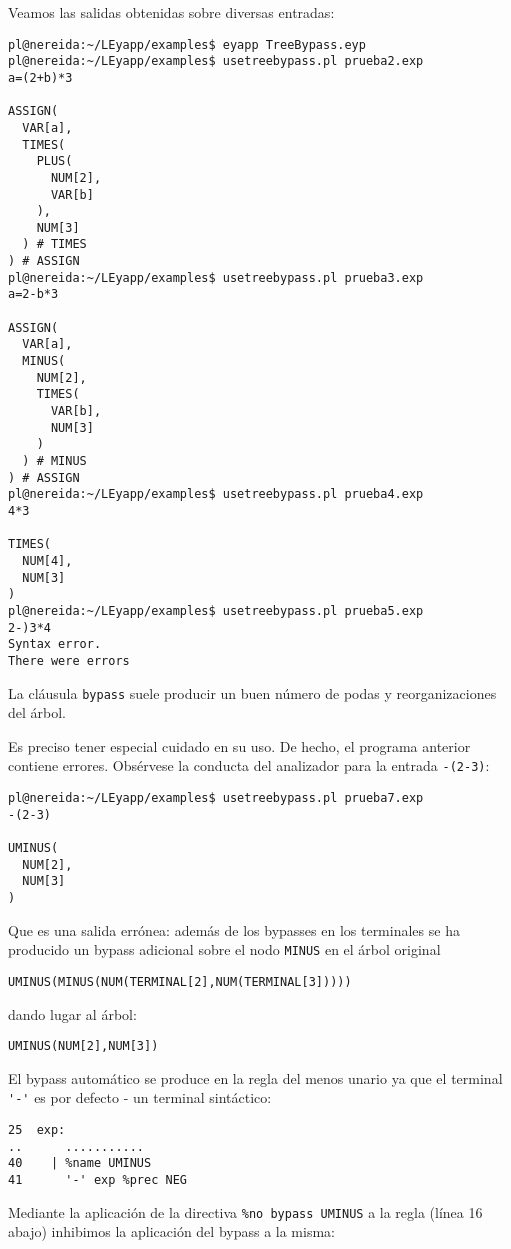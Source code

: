 Veamos las salidas obtenidas sobre diversas entradas:
\begin{verbatim}
pl@nereida:~/LEyapp/examples$ eyapp TreeBypass.eyp
pl@nereida:~/LEyapp/examples$ usetreebypass.pl prueba2.exp
a=(2+b)*3

ASSIGN(
  VAR[a],
  TIMES(
    PLUS(
      NUM[2],
      VAR[b]
    ),
    NUM[3]
  ) # TIMES
) # ASSIGN
pl@nereida:~/LEyapp/examples$ usetreebypass.pl prueba3.exp
a=2-b*3

ASSIGN(
  VAR[a],
  MINUS(
    NUM[2],
    TIMES(
      VAR[b],
      NUM[3]
    )
  ) # MINUS
) # ASSIGN
pl@nereida:~/LEyapp/examples$ usetreebypass.pl prueba4.exp
4*3

TIMES(
  NUM[4],
  NUM[3]
)
pl@nereida:~/LEyapp/examples$ usetreebypass.pl prueba5.exp
2-)3*4
Syntax error.
There were errors
\end{verbatim}

La cláusula \verb|bypass| suele producir un 
buen número de podas y reorganizaciones del árbol.

Es preciso tener especial cuidado en su uso.
De hecho, el programa anterior contiene errores.
Obsérvese la conducta del analizador para la entrada 
\verb|-(2-3)|:
\begin{verbatim}
pl@nereida:~/LEyapp/examples$ usetreebypass.pl prueba7.exp
-(2-3)

UMINUS(
  NUM[2],
  NUM[3]
)
\end{verbatim}

Que es una salida errónea: además de los bypasses en los terminales
se ha producido un bypass adicional sobre el nodo
\verb|MINUS| en el árbol original 

\begin{verbatim}
UMINUS(MINUS(NUM(TERMINAL[2],NUM(TERMINAL[3]))))
\end{verbatim}

dando lugar al árbol:
\begin{verbatim}
UMINUS(NUM[2],NUM[3])
\end{verbatim}

El bypass automático se 
produce en la regla del menos unario ya que 
el terminal \verb|'-'| es  por defecto -
un terminal sintáctico:
\begin{verbatim}
25  exp:
..      ...........
40    | %name UMINUS
41      '-' exp %prec NEG
\end{verbatim}


Mediante la aplicación de la directiva
\verb|%no bypass UMINUS| a la regla (línea 16 abajo) 
inhibimos la aplicación del bypass a la misma:

